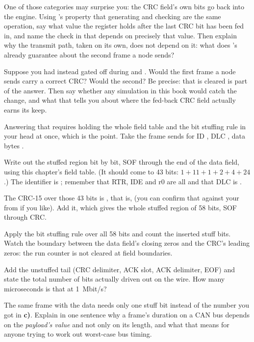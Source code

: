  One of those categories may surprise you: the CRC field's own bits go back into the engine.
Using 's property that generating and checking are the same operation, say what value
the register holds after the last CRC bit has been fed in, and name the check in  that
depends on precisely that value. Then explain why the transmit path, taken on its own, does not depend
on it: what does 's  already guarantee about the second frame a node
sends?

 Suppose you had instead gated  off during  and
. Would the first frame a node sends carry a correct CRC? Would the second? Be
precise: that  is cleared is part of the answer. Then say whether any simulation in this
book would catch the change, and what that tells you about where the fed-back CRC field actually
earns its keep.

\label{c16:ex:framelen}
Answering that requires holding the whole field table and the bit stuffing rule in your head at once,
which is the point. Take the frame  sends for ID , DLC , data
bytes .

 Write out the stuffed region bit by bit, SOF through the end of the data field, using this
chapter's field table. (It should come to 43 bits: $1 + 11 + 1 + 2 + 4 + 24$.) The identifier is
; remember that RTR, IDE and r0 are all  and that DLC is .

 The CRC-15 over those 43 bits is , that is,  (you can
confirm that against your  from  if you like). Add it, which gives the
whole stuffed region of 58 bits, SOF through CRC.

 Apply the bit stuffing rule over all 58 bits and count the inserted stuff bits. Watch the
boundary between the data field's closing zeros and the CRC's leading zeros: the run counter is not
cleared at field boundaries.

 Add the unstuffed tail (CRC delimiter, ACK slot, ACK delimiter, EOF) and state the total
number of bits actually driven out on the wire. How many microseconds is that at 1~Mbit/s?

 The same frame with the data  needs only one stuff bit instead of the number
you got in \textbf{c)}. Explain in one sentence why a frame's duration on a CAN bus depends on the
\emph{payload's value} and not only on its length, and what that means for anyone trying to work out
worst-case bus timing.
